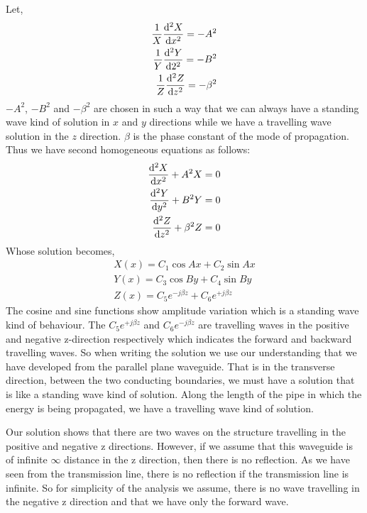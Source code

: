Let,  
\begin{align*}
\frac{1}{X}\dv[2]{X}{x} = -A^2\\
\frac{1}{Y}\dv[2]{Y}{2} = -B^2\\
\frac{1}{Z}\dv[2]{Z}{z} = -\beta^2
\end{align*}
$-A^2$, $-B^2$ and $-\beta^2$ are chosen in such a way that we can always have a standing wave kind of solution in $x$ and $y$ directions while we have a travelling wave solution in the $z$ direction. $\beta$ is the phase constant of the mode of propagation. Thus we have second homogeneous equations as follows:
\begin{align*}
\dv[2]{X}{x} + A^2X = 0\\
\dv[2]{Y}{y} + B^2Y = 0\\
\dv[2]{Z}{z} + \beta^2Z = 0
\end{align*}
Whose solution becomes,   
\begin{align*}
X(x) = C_{1}\cos Ax + C_{2}\sin Ax\\
Y(x) = C_{3}\cos By + C_{4}\sin By\\
Z(x) = C_{5} e^{-j \beta z} + C_{6} e^{+j \beta z}
\end{align*}                                  
The cosine and sine functions show amplitude variation which is a standing wave kind of behaviour. The $C_{5}e^{+j\beta z}$ and $C_{6}e^{-j\beta z}$ are travelling waves in the positive and negative z-direction respectively which indicates the forward and backward travelling waves. So when writing the solution we use our understanding that we have developed from the parallel plane waveguide. That is in the transverse direction, between the two conducting boundaries, we must have a solution that is like a standing wave kind of solution. Along the length of the pipe in which the energy is being propagated, we have a travelling wave kind of solution.

Our solution shows that there are two waves on the structure travelling in the positive and negative z directions. However, if we assume that this waveguide is of infinite $\infty$ distance in the z direction, then there is no reflection. As we have seen from the transmission line, there is no reflection if the transmission line is infinite. So for simplicity of the analysis we assume, there is no wave travelling in the negative z direction and that we have only the forward wave.

